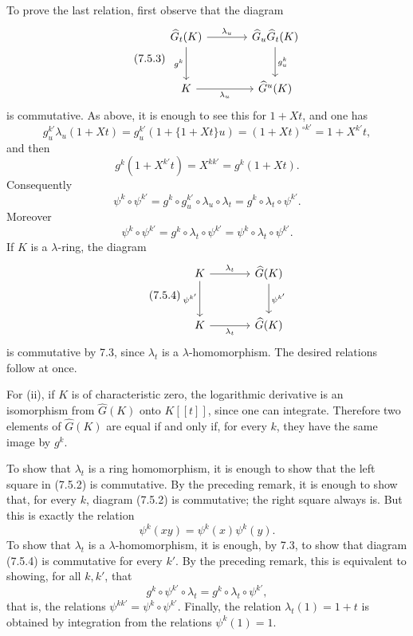 To prove the last relation, first observe that the diagram
\begin{equation}\tag{7.5.3}
\begin{tikzcd}[column sep=large,row sep=large]
\widehat G_t(K) \arrow[r,"\lambda_u"] \arrow[d,"g^k"'] &
\widehat G_u\widehat G_t(K) \arrow[d,"g^k_u"]\\
K \arrow[r,"\lambda_u"'] &
\widehat G^u(K)
\end{tikzcd}
\end{equation}
is commutative. As above, it is enough to see this for \(1+Xt\), and one has
\[
  g^{k'}_u\lambda_u(1+Xt)
  =
  g^{k'}_u(1+\{1+Xt\}u)
  =
  (1+Xt)^{\circ k'}
  =
  1+X^{k'}t,
\]
and then
\[
  g^k(1+X^{k'}t)=X^{kk'}=g^k(1+Xt).
\]
Consequently
\[
  \psi^k\circ\psi^{k'}
  =
  g^k\circ g^{k'}_u\circ\lambda_u\circ\lambda_t
  =
  g^k\circ\lambda_t\circ\psi^{k'}.
\]
Moreover
\[
  \psi^k\circ\psi^{k'}
  =
  g^k\circ\lambda_t\circ\psi^{k'}
  =
  \psi^k\circ\lambda_t\circ\psi^{k'}.
\]
If \(K\) is a \(\lambda\)-ring, the diagram
\begin{equation}\tag{7.5.4}
\begin{tikzcd}[column sep=large,row sep=large]
K \arrow[r,"\lambda_t"] \arrow[d,"\psi^{k'}"'] &
\widehat G(K) \arrow[d,"\psi^{k'}"]\\
K \arrow[r,"\lambda_t"'] &
\widehat G(K)
\end{tikzcd}
\end{equation}
is commutative by 7.3, since \(\lambda_t\) is a \(\lambda\)-homomorphism. The desired relations follow at once.

For (ii), if \(K\) is of characteristic zero, the logarithmic derivative is an isomorphism from \(\widehat G(K)\) onto \(K[[t]]\), since one can integrate. Therefore two elements of \(\widehat G(K)\) are equal if and only if, for every \(k\), they have the same image by \(g^k\).

To show that \(\lambda_t\) is a ring homomorphism, it is enough to show that the left square in (7.5.2) is commutative. By the preceding remark, it is enough to show that, for every \(k\), diagram (7.5.2) is commutative; the right square always is. But this is exactly the relation
\[
  \psi^k(xy)=\psi^k(x)\psi^k(y).
\]
To show that \(\lambda_t\) is a \(\lambda\)-homomorphism, it is enough, by 7.3, to show that diagram (7.5.4) is commutative for every \(k'\). By the preceding remark, this is equivalent to showing, for all \(k,k'\), that
\[
  g^k\circ\psi^{k'}\circ\lambda_t
  =
  g^k\circ\lambda_t\circ\psi^{k'},
\]
that is, the relations \(\psi^{kk'}=\psi^k\circ\psi^{k'}\). Finally, the relation \(\lambda_t(1)=1+t\) is obtained by integration from the relations \(\psi^k(1)=1\).

